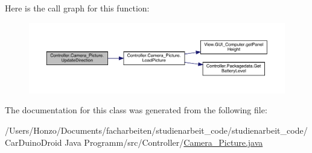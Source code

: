 Here is the call graph for this function\+:
\nopagebreak
\begin{figure}[H]
\begin{center}
\leavevmode
\includegraphics[width=350pt]{class_controller_1_1_camera___picture_af29e712d375616bb2275215f3ebdc397_cgraph}
\end{center}
\end{figure}




The documentation for this class was generated from the following file\+:\begin{DoxyCompactItemize}
\item 
/\+Users/\+Honzo/\+Documents/facharbeiten/studienarbeit\+\_\+code/studienarbeit\+\_\+code/\+Car\+Duino\+Droid Java Programm/src/\+Controller/\hyperlink{_camera___picture_8java}{Camera\+\_\+\+Picture.\+java}\end{DoxyCompactItemize}
